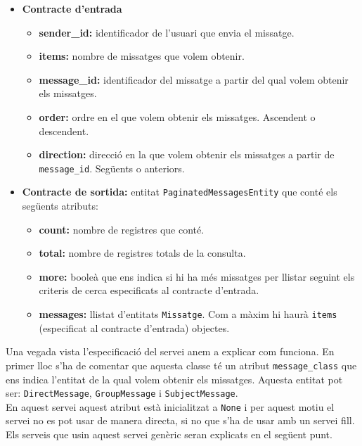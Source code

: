 \begin{itemize}
			\begin{itemize}
					\item \textbf{Contracte d'entrada}
						\begin{itemize}
							\item \textbf{sender\_id:} identificador de l'usuari que envia el missatge.
							\item \textbf{items:} nombre de missatges que volem obtenir.
							\item \textbf{message\_id:} identificador del missatge a partir del qual volem obtenir els missatges.
							\item \textbf{order:} ordre en el que volem obtenir els missatges. Ascendent o descendent.
							\item \textbf{direction:} direcció en la que volem obtenir els missatges a partir de \texttt{message\_id}. Següents o anteriors.
						\end{itemize}
					\item \textbf{Contracte de sortida:} entitat \texttt{PaginatedMessagesEntity} que conté els següents atributs:
					\begin{itemize}
						\item \textbf{count:} nombre de registres que conté.
						\item \textbf{total:} nombre de registres totals de la consulta.
						\item \textbf{more:} booleà que ens indica si hi ha més missatges per llistar seguint els criteris de cerca especificats al contracte d'entrada.
						\item \textbf{messages:} llistat d'entitats \texttt{Missatge}. Com a màxim hi haurà \texttt{items} (especificat al contracte d'entrada) objectes.
					\end{itemize}
			\end{itemize}
			
			Una vegada vista l'especificació del servei anem a explicar com funciona. En primer lloc s'ha de comentar que aquesta classe té un atribut \texttt{message\_class} que ens indica l'entitat de la qual volem obtenir els missatges. Aquesta entitat pot ser: \texttt{DirectMessage}, \texttt{GroupMessage} i \texttt{SubjectMessage}.\\
			
			En aquest servei aquest atribut està inicialitzat a \texttt{None} i per aquest motiu el servei no es pot usar de manera directa, si no que s'ha de usar amb un servei fill. Els serveis que usin aquest servei genèric seran explicats en el següent punt.\\
			

\end{itemize}
